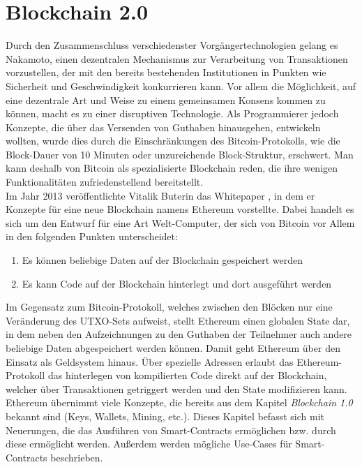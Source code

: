 \chapter{Blockchain 2.0}
Durch den Zusammenschluss verschiedenster Vorgängertechnologien gelang es Nakamoto, einen dezentralen Mechanismus zur Verarbeitung von Transaktionen vorzustellen, der mit den bereits bestehenden Institutionen in Punkten wie Sicherheit und Geschwindigkeit konkurrieren kann. Vor allem die Möglichkeit, auf eine dezentrale Art und Weise zu einem gemeinsamen Konsens kommen zu können, macht es zu einer disruptiven Technologie. Als Programmierer jedoch Konzepte, die über das Versenden von Guthaben hinausgehen, entwickeln wollten, wurde dies durch die Einschränkungen des Bitcoin-Protokolls, wie die Block-Dauer von 10 Minuten oder unzureichende Block-Struktur, erschwert. Man kann deshalb von Bitcoin als spezialisierte Blockchain reden, die ihre wenigen Funktionalitäten zufriedenstellend bereitstellt.\\

Im Jahr 2013 veröffentlichte Vitalik Buterin das Whitepaper \cite{buterin_whitepaper_2013}, in dem er Konzepte für eine neue Blockchain namens Ethereum vorstellte. Dabei handelt es sich um den Entwurf für eine Art Welt-Computer, der sich von Bitcoin vor Allem in den folgenden Punkten unterscheidet:
\begin{enumerate}
	\item Es können beliebige Daten auf der Blockchain gespeichert werden
	\item Es kann Code auf der Blockchain hinterlegt und dort ausgeführt werden
	\end{enumerate}
Im Gegensatz zum Bitcoin-Protokoll, welches zwischen den Blöcken nur eine Veränderung des UTXO-Sets aufweist, stellt Ethereum einen globalen State dar, in dem neben den Aufzeichnungen zu den Guthaben der Teilnehmer auch andere beliebige Daten abgespeichert werden können. Damit geht Ethereum über den Einsatz als Geldsystem hinaus.
Über spezielle Adressen erlaubt das Ethereum-Protokoll das hinterlegen von kompilierten Code direkt auf der Blockchain, welcher über Transaktionen getriggert werden und den State modifizieren kann. 
\\

Ethereum übernimmt viele Konzepte, die bereits aus dem Kapitel \emph{Blockchain 1.0} bekannt sind (Keys, Wallets, Mining, etc.). Dieses Kapitel befasst sich mit Neuerungen, die das Ausführen von Smart-Contracts ermöglichen bzw. durch diese ermöglicht werden. Außerdem werden mögliche Use-Cases für Smart-Contracts beschrieben.
